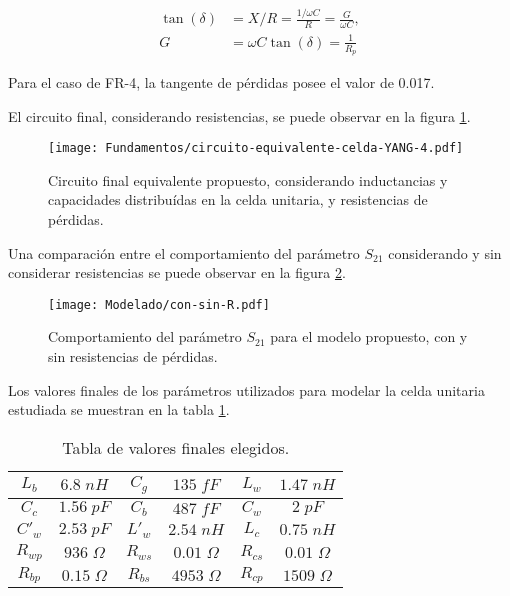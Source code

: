 \begin{align}
	\tan(\delta) &= X/R = \frac{1/\omega C}{R} = \frac{G}{\omega C}, \\
	G &= \omega C \tan(\delta) = \frac{1}{R_p}
\end{align}

Para el caso de FR-4, la tangente de pérdidas posee el valor de 0.017.

El circuito final, considerando resistencias, se puede observar en la figura \ref{fig:modelo-circuital-todojunto-conR}.

\begin{figure}[h]
	\centering
	\texttt{[image: Fundamentos/circuito-equivalente-celda-YANG-4.pdf]}
	\caption{Circuito final equivalente propuesto, considerando inductancias y capacidades distribuídas en la celda unitaria, y resistencias de pérdidas.}
	\label{fig:modelo-circuital-todojunto-conR}
\end{figure}

Una comparación entre el comportamiento del parámetro $S_{21}$ considerando y sin considerar resistencias se puede observar en la figura \ref{fig:con-sin-R}.

\begin{figure}[h]
	\centering
	\texttt{[image: Modelado/con-sin-R.pdf]}
	\caption{Comportamiento del parámetro $S_{21}$ para el modelo propuesto, con y sin resistencias de pérdidas.}
	\label{fig:con-sin-R}
\end{figure}

Los valores finales de los parámetros utilizados para modelar la celda unitaria estudiada se muestran en la tabla \ref{table:valoresFinalesModelo}.

\begin{table}
	\centering
	\begin{tabular}{| c c | c c | c c |}
		\hline 
		$L_b$ & $6.8\; nH$ & $C_g$ & $135\; fF$ & $L_w$ & $1.47\; nH$ \\
		\hline
		$C_c$ & $1.56\; pF$ & $C_b$ & $487 \;fF$ & $C_w$ & $2 \; pF$\\
		\hline
		$C'_w$ & $2.53\; pF$ & $L'_w$ & $2.54\; nH$ & $L_c$ & $0.75\; nH$\\
		\hline
		$R_{wp}$ & $936\; \Omega$ & $R_{ws}$ & $0.01\; \Omega$ & $R_{cs}$ & $0.01\; \Omega$\\
		\hline
		$R_{bp}$ & $0.15\; \Omega$ & $R_{bs}$ & $4953\; \Omega$ & $R_{cp}$ & $1509\; \Omega$\textbf{}\\
		\hline
	\end{tabular}
	\caption{Tabla de valores finales elegidos.}
	\label{table:valoresFinalesModelo}
\end{table}

